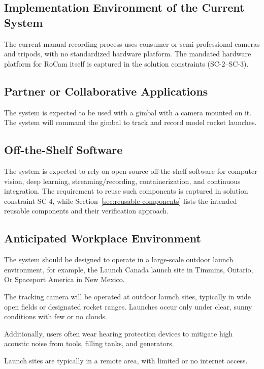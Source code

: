 \documentclass[12pt]{article}
\begin{document}
\subsection{Implementation Environment of the Current System}

The current manual recording process uses consumer or semi-professional cameras
and tripods, with no standardized hardware platform. The mandated hardware
platform for RoCam itself is captured in the solution constraints (SC-2--SC-3).

\subsection{Partner or Collaborative Applications}

The system is expected to be used with a gimbal with a camera mounted on it.
The system will command the gimbal to track and record model rocket launches.

\subsection{Off-the-Shelf Software}

The system is expected to rely on open-source off-the-shelf software for
computer vision, deep learning, streaming/recording, containerization, and
continuous integration. The requirement to reuse such components is captured in
solution constraint SC-4, while Section~\ref{sec:reusable-components} lists the
intended reusable components and their verification approach.

\subsection{Anticipated Workplace Environment}

The system should be designed to operate in a large-scale outdoor launch
environment, for example, the Launch Canada launch site in Timmins, Ontario, Or
Spaceport America in New Mexico.

The tracking camera will be operated at outdoor launch sites, typically in wide
open fields or designated rocket ranges. Launches occur only under clear, sunny
conditions with few or no clouds.

Additionally, users often wear hearing protection devices to mitigate high
acoustic noise from tools, filling tanks, and generators.

Launch sites are typically in a remote area, with limited or no internet
access.
\end{document}
